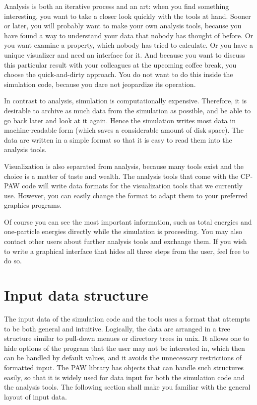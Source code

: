 \documentclass[final,12pt]{article}
\begin{document}
Analysis is both an iterative process and an art: when you find
something interesting, you want to take a closer look quickly with the
tools at hand. Sooner or later, you will probably want to make your
own analysis tools, because you have found a way to understand your
data that nobody has thought of before. Or you want examine a
property, which nobody has tried to calculate. Or you have a unique
visualizer and need an interface for it.  And because you want to
discuss this particular result with your colleagues at the upcoming
coffee break, you choose the quick-and-dirty approach.  You do not
want to do this inside the simulation code, because you dare not
jeopardize its operation.

In contrast to analysis, simulation is computationally expensive.
Therefore, it is desirable to archive as much data from the simulation
as possible, and be able to go back later and look at it again. Hence
the simulation writes most data in machine-readable form (which saves
a considerable amount of disk space).  The data are written in a
simple format so that it is easy to read them into the analysis tools.

Visualization is also separated from analysis, because many tools
exist and the choice is a matter of taste and wealth. The analysis
tools that come with the CP-PAW code will write data formats for the
visualization tools that we currently use.  However, you can easily
change the format to adapt them to your preferred graphics programs.

Of course you can see the most important information, such as total
energies and one-particle energies directly while the simulation is
proceeding. You may also contact other users about further analysis
tools and exchange them. If you wish to write a graphical interface
that hides all three steps from the user, feel free to do so.


\section{Input data structure}
%
The input data of the simulation code and the tools uses a format
that attempts to be both general and intuitive. Logically, the data
are arranged in a tree structure similar to pull-down menues or
directory trees in unix. It allows one to hide options of the program that
the user may not be interested in, which then can be handled by
default values, and it avoids the unnecessary restrictions of formatted
input. The PAW library has objects that can handle such structures
easily, so that it is widely used for data input for both the
simulation code and the analysis tools. The following section shall
make you familiar with the general layout of input data.
%
\end{document}
